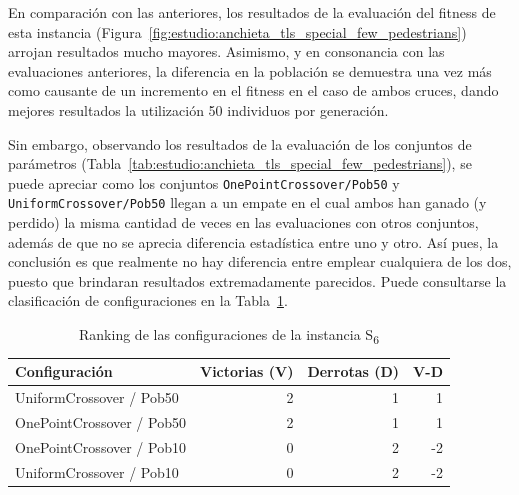En comparación con las anteriores, los resultados de la evaluación del fitness de esta instancia (Figura~\ref{fig:estudio:anchieta_tls_special_few_pedestrians}) arrojan resultados mucho mayores. Asimismo, y en consonancia con las evaluaciones anteriores, la diferencia en la población se demuestra una vez más como causante de un incremento en el fitness en el caso de ambos cruces, dando mejores resultados la utilización 50 individuos por generación.

Sin embargo, observando los resultados de la evaluación de los conjuntos de parámetros (Tabla~\ref{tab:estudio:anchieta_tls_special_few_pedestrians}), se puede apreciar como los conjuntos \texttt{OnePointCrossover/Pob50} y \texttt{UniformCrossover/Pob50} llegan a un empate en el cual ambos han ganado (y perdido) la misma cantidad de veces en las evaluaciones con otros conjuntos, además de que no se aprecia diferencia estadística entre uno y otro. Así pues, la conclusión es que realmente no hay diferencia entre emplear cualquiera de los dos, puesto que brindaran resultados extremadamente parecidos. Puede consultarse la clasificación de configuraciones en la Tabla~\ref{tab:rankingS6}.

\begin{table}[h]
\centering
\caption{Ranking de las configuraciones de la instancia S\textsubscript{6}}
\label{tab:rankingS6}
\begin{tabular}{lrrr}
\hline
\multicolumn{1}{l}{\textbf{Configuración}} & \textbf{Victorias (V)} & \textbf{Derrotas (D)} & \textbf{V-D} \\ \hline
UniformCrossover / Pob50                   & 2                      & 1                     & 1            \\ \hline
OnePointCrossover / Pob50                  & 2                      & 1                     & 1            \\ \hline
OnePointCrossover / Pob10                  & 0                      & 2                     & -2           \\ \hline
UniformCrossover / Pob10                   & 0                      & 2                     & -2           \\ \hline
\end{tabular}
\end{table}

